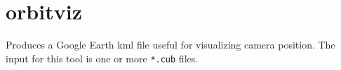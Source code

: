 
\section{orbitviz}
\label{orbitviz}

Produces a Google Earth kml file useful for visualizing camera
position. The input for this tool is one or more \verb#*.cub# files.

